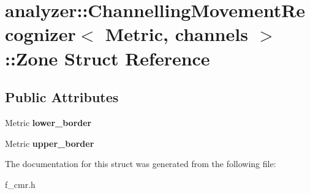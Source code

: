 \hypertarget{structanalyzer_1_1_channelling_movement_recognizer_1_1_zone}{}\section{analyzer\+::Channelling\+Movement\+Recognizer$<$ Metric, channels $>$\+::Zone Struct Reference}
\label{structanalyzer_1_1_channelling_movement_recognizer_1_1_zone}
\subsection*{Public Attributes}
\begin{DoxyCompactItemize}
\item 
\mbox{\label{structanalyzer_1_1_channelling_movement_recognizer_1_1_zone_aacd71566fdf33cbe96efe0569e9b9c54}} 
Metric {\bfseries lower\+\_\+border}
\item 
\mbox{\label{structanalyzer_1_1_channelling_movement_recognizer_1_1_zone_a048693e3eb2e5c001cf8b7ad6c061813}} 
Metric {\bfseries upper\+\_\+border}
\end{DoxyCompactItemize}


The documentation for this struct was generated from the following file\+:\begin{DoxyCompactItemize}
\item 
f\+\_\+cmr.\+h\end{DoxyCompactItemize}

